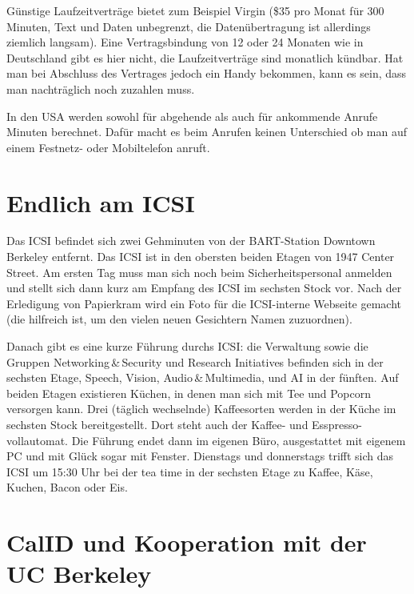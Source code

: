 \documentclass[a4paper]{scrreprt}
\begin{document}
Günstige Laufzeitverträge bietet zum Beispiel Virgin (\$35 pro Monat für 300 Minuten, Text und Daten unbegrenzt, die Datenübertragung ist allerdings ziemlich langsam). Eine Vertragsbindung von 12 oder 24 Monaten wie in Deutschland gibt es hier nicht, die Laufzeitverträge sind monatlich kündbar. Hat man bei Abschluss des Vertrages jedoch ein Handy bekommen, kann es sein, dass man nachträglich noch zuzahlen muss.

In den USA werden sowohl für abgehende als auch für ankommende Anrufe Minuten berechnet. Dafür macht es beim Anrufen keinen Unterschied ob man auf einem Festnetz- oder Mobiltelefon anruft.

\section{Endlich am ICSI}

Das ICSI befindet sich zwei Gehminuten von der BART-Station Downtown Berkeley entfernt. Das ICSI ist in den obersten beiden Etagen von 1947 Center Street. Am ersten Tag muss man sich noch beim Sicherheitspersonal anmelden und stellt sich dann kurz am Empfang des ICSI im sechsten Stock vor. Nach der Erledigung von  Papierkram wird ein Foto für die ICSI-interne Webseite gemacht (die hilfreich ist, um den vielen neuen Gesichtern Namen zuzuordnen).

Danach gibt es eine kurze Führung durchs ICSI: die Verwaltung sowie die Gruppen Networking\,\&\,Security und Research Initiatives befinden sich in der sechsten Etage, Speech, Vision, Audio\,\&\,Multimedia, und AI in der fünften. Auf beiden Etagen existieren Küchen, in denen man sich mit Tee und Popcorn versorgen kann. Drei (täglich wechselnde) Kaffeesorten werden in der Küche im sechsten Stock bereitgestellt. Dort steht auch der Kaffee- und Esspresso-vollautomat. Die Führung endet dann im eigenen Büro, ausgestattet mit eigenem PC und mit Glück sogar mit Fenster. Dienstags und donnerstags trifft sich das ICSI um 15:30 Uhr bei der tea time in der sechsten Etage zu Kaffee, Käse, Kuchen, Bacon oder Eis.

\section{CalID und Kooperation mit der UC Berkeley}
\end{document}
